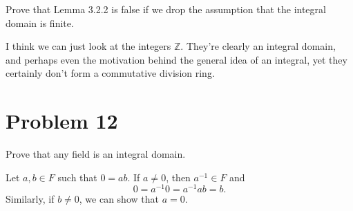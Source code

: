\documentclass[12pt]{article}
\newcommand{\Z}{\mathbb{Z}}
\begin{document}
Prove that Lemma 3.2.2 is false if we drop the assumption that the integral domain is finite.

I think we can just look at the integers $\Z$.  They're clearly an integral domain, and
perhaps even the motivation behind the general idea of an integral, yet they certainly
don't form a commutative division ring.

\section*{Problem 12}

Prove that any field is an integral domain.

Let $a,b\in F$ such that $0=ab$.
If $a\neq 0$, then $a^{-1}\in F$ and
\begin{equation*}
0=a^{-1}0=a^{-1}ab = b.
\end{equation*}
Similarly, if $b\neq 0$, we can show that $a=0$.
\end{document}
